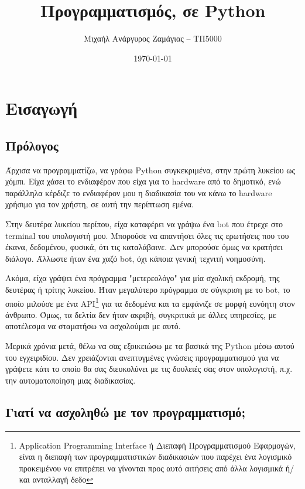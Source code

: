 \documentclass[14pt]{extreport}
\title{Προγραμματισμός, σε Python}
\author{Μιχαήλ Ανάργυρος Ζαμάγιας -- ΤΠ5000}
\date{\today}
\begin{document}
\maketitle

\tableofcontents
\newpage

\chapter{Εισαγωγή}
\newpage

\section{Πρόλογος}

Άρχισα να προγραμματίζω, να γράφω Python συγκεκριμένα, στην πρώτη λυκείου ως χόμπι. Είχα χάσει το ενδιαφέρον που είχα για το hardware από το δημοτικό, ενώ παράλληλα κέρδιζε το ενδιαφέρον μου η διαδικασία του να κάνω το hardware χρήσιμο για τον χρήστη, σε αυτή την περίπτωση εμένα.


Στην δευτέρα λυκείου περίπου, είχα καταφέρει να γράψω ένα bot που έτρεχε στο terminal του υπολογιστή μου. Μπορούσε να απαντήσει όλες τις ερωτήσεις που του έκανα, δεδομένου, φυσικά, ότι τις καταλάβαινε. Δεν μπορούσε όμως να κρατήσει διάλογο. Άλλωστε ήταν ένα χαζό bot, όχι κάποια γενική τεχνιτή νοημοσύνη.

Ακόμα, είχα γράψει ένα πρόγραμμα "μετερεολόγο" για μία σχολική εκδρομή, της δευτέρας ή τρίτης λυκείου. Ήταν μεγαλύτερο πρόγραμμα σε σύγκριση με το bot, το  οποίο μιλούσε με ένα API\footnote{Application Programming Interface ή Διεπαφή Προγραμματισμού Εφαρμογών, είναι η διεπαφή των προγραμματιστικών διαδικασιών που παρέχει ένα λογισμικό προκειμένου να επιτρέπει να γίνονται προς αυτό αιτήσεις από άλλα λογισμικά ή/και ανταλλαγή δεδο} για τα δεδομένα και τα εμφάνιζε σε μορφή ευνόητη στον άνθρωπο. Όμως, τα δελτία δεν ήταν ακριβή, συγκριτικά με άλλες υπηρεσίες, με αποτέλεσμα να σταματήσω να ασχολούμαι με αυτό.

Μερικά χρόνια μετά, θέλω να σας εξοικειώσω με τα βασικά της Python μέσω αυτού του εγχειριδίου. Δεν χρειάζονται ανεπτυγμένες γνώσεις προγραμματισμού για να γράψετε κάτι το οποίο θα σας διευκολύνει με τις δουλειές σας στον υπολογιστή, π.χ. την αυτοματοποίηση μιας διαδικασίας.

\section{Γιατί να ασχοληθώ με τον προγραμματισμό;}
\end{document}
